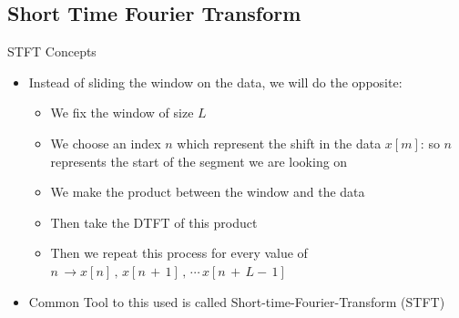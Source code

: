 \documentclass{beamer}
\begin{document}
\subsection{Short Time Fourier Transform}
\begin{frame}[t]{STFT Concepts}

\begin{itemize}

\item Instead of sliding the window on the data, we will do the opposite:

	\begin{itemize}
	\item We fix the window of size $L$
	
	\item We choose an index $n$ which represent the shift in the data $x[m]$: so $n$ represents the start of the segment we are looking on 
	
	\item We make the product between the window and the data
	
	\item Then take the DTFT of this product
	
	
	\item Then we repeat this process for every value of $n \, \rightarrow x[n] \, , \, x[n \, + \, 1] \, , \, \cdots \, x[n \, + \, L - \, 1]$
	\end{itemize}

\item Common Tool to this used is called Short-time-Fourier-Transform (STFT)

\end{itemize}


\end{frame}
\end{document}
